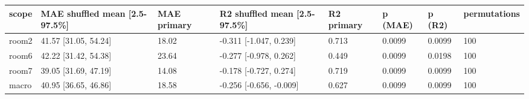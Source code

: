\begin{tabular}{llllllll}
\hline
scope & MAE shuffled mean [2.5-97.5\%] & MAE primary & R2 shuffled mean [2.5-97.5\%] & R2 primary & p (MAE) & p (R2) & permutations \\
\hline
room2 & 41.57 [31.05, 54.24] & 18.02 & -0.311 [-1.047, 0.239] & 0.713 & 0.0099 & 0.0099 & 100 \\
room6 & 42.22 [31.42, 54.38] & 23.64 & -0.277 [-0.978, 0.262] & 0.449 & 0.0099 & 0.0198 & 100 \\
room7 & 39.05 [31.69, 47.19] & 14.08 & -0.178 [-0.727, 0.274] & 0.719 & 0.0099 & 0.0099 & 100 \\
macro & 40.95 [36.65, 46.86] & 18.58 & -0.256 [-0.656, -0.009] & 0.627 & 0.0099 & 0.0099 & 100 \\
\hline
\end{tabular}
